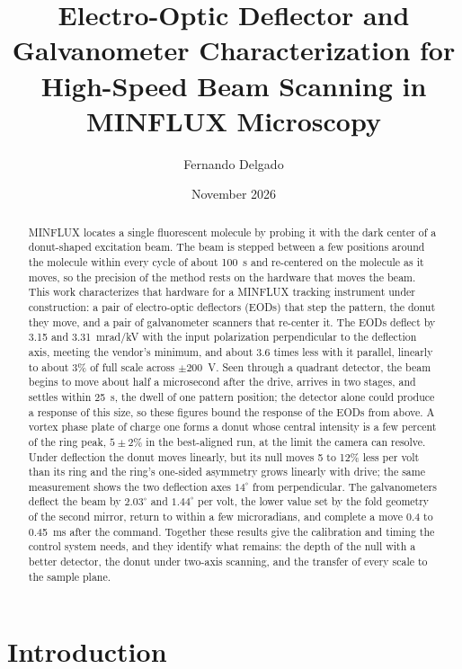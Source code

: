 \documentclass{article}
\title{Electro-Optic Deflector and Galvanometer Characterization for High-Speed Beam Scanning in
MINFLUX Microscopy}
\author{Fernando Delgado}
\date{November 2026}
\begin{document}
\maketitle

\begin{abstract}
MINFLUX locates a single fluorescent molecule by probing it with the dark center of a donut-shaped
excitation beam. The beam is stepped between a few positions around the molecule within every
cycle of about 100~\textmu s and re-centered on the molecule as it moves, so the precision of the
method rests on the hardware that moves the beam. This work characterizes that hardware for a
MINFLUX tracking instrument under construction: a pair of electro-optic deflectors (EODs) that step
the pattern, the donut they move, and a pair of galvanometer scanners that re-center it. The EODs
deflect by 3.15 and 3.31~mrad/kV with the input polarization perpendicular to the deflection
axis, meeting the vendor's minimum, and about 3.6 times less with it parallel, linearly to about
3\% of full scale across $\pm200$~V. Seen through a quadrant detector, the beam begins to move
about half a microsecond after the drive, arrives in two stages, and settles within 25~\textmu s,
the dwell of one pattern position; the detector alone could produce a response of this size, so
these figures bound the response of the EODs from above. A vortex phase plate of charge one forms
a donut whose central intensity is a few percent of the ring peak, $5\pm2\%$ in the best-aligned
run, at the limit the camera can resolve. Under deflection the donut moves linearly, but its null
moves 5 to 12\% less per volt than its ring and the ring's one-sided asymmetry grows linearly with
drive; the same measurement shows the two deflection axes $14^\circ$ from perpendicular. The galvanometers deflect the beam by $2.03^\circ$ and $1.44^\circ$
per volt, the lower value set by the fold geometry of the second mirror, return to within a few
microradians, and complete a move 0.4 to 0.45~ms after the command. Together these results give
the calibration and timing the control system needs, and they identify what remains: the depth of
the null with a better detector, the donut under two-axis scanning, and the transfer of every
scale to the sample plane.
\end{abstract}

\section{Introduction}
\end{document}
